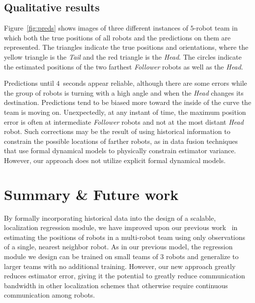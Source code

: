 \documentclass[letterpaper, 10 pt, conference]{ieeeconf}  %
\begin{document}
   	\subsection{Qualitative results}
	\label{sec:qualitative_results}

    Figure~\ref{fig:preds} shows images of three different instances of
    $5$-robot team in which both the true positions of all robots and
    the predictions on them are represented. The triangles indicate the
    true positions and orientations, where the yellow triangle is the
    \emph{Tail} and the red triangle is the \emph{Head}. The circles
    indicate the estimated positions of the two farthest \emph{Follower}
    robots as well as the \emph{Head}.
	
    Predictions until $4$~seconds appear
    reliable, although there are some errors while the group of robots
    is turning with a high angle and when the \emph{Head} changes its
    destination. Predictions tend to be biased more toward the inside of
    the curve the team is moving on. Unexpectedly, at any instant of
    time, the maximum position error is often at intermediate
    \emph{Follower} robots and not at the most distant \emph{Head}
    robot. Such corrections may be the result of using historical
    information to constrain the possible locations of farther robots,
    as in data fusion techniques that use formal dynamical models to
    physically constrain estimator variance. However, our approach does
    not utilize explicit formal dynamical models.
	
	\section{Summary \& Future work}
	\label{sec:discussion_and_future_work}

    By formally incorporating historical data into the design of a
    scalable, localization regression module, we have improved upon our
    previous work~\cite{CPR17} in estimating the positions of robots in
    a multi-robot team using only observations of a single, nearest
    neighbor robot. As in our previous model, the regression module we
    design can be trained on small teams of 3 robots and generalize to
    larger teams with no additional training. However, our new approach
    greatly reduces estimator error, giving it the potential to greatly
    reduce communication bandwidth in other localization schemes that
    otherwise require continuous communication among robots.
	
\end{document}

